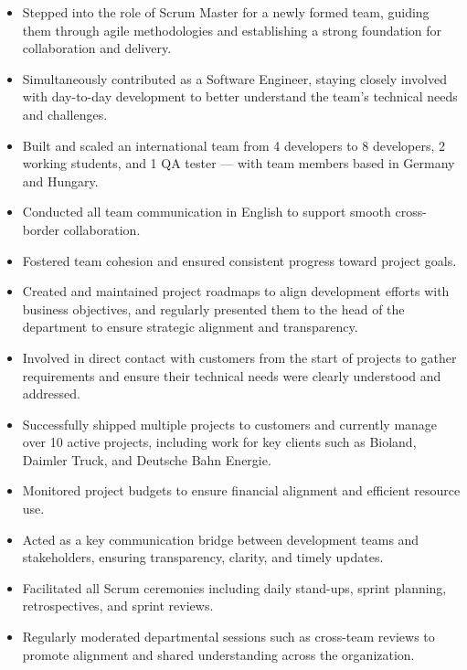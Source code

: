 \documentclass[10pt, a4paper]{cvhari}
\begin{document}
    \begin{itemize}
        \item Stepped into the role of Scrum Master for a newly formed team, guiding them through agile methodologies and establishing a strong foundation for collaboration and delivery.

        \item Simultaneously contributed as a Software Engineer, staying closely involved with day-to-day development to better understand the team’s technical needs and challenges.

        \item Built and scaled an international team from 4 developers to 8 developers, 2 working students, and 1 QA tester — with team members based in Germany and Hungary.

        \item Conducted all team communication in English to support smooth cross-border collaboration.

        \item Fostered team cohesion and ensured consistent progress toward project goals.

        \item Created and maintained project roadmaps to align development efforts with business objectives, and regularly presented them to the head of the department to ensure strategic alignment and transparency.

        \item Involved in direct contact with customers from the start of projects to gather requirements and ensure their technical needs were clearly understood and addressed.

        \item Successfully shipped multiple projects to customers and currently manage over 10 active projects, including work for key clients such as Bioland, Daimler Truck, and Deutsche Bahn Energie.

        \item Monitored project budgets to ensure financial alignment and efficient resource use.

        \item Acted as a key communication bridge between development teams and stakeholders, ensuring transparency, clarity, and timely updates.

        \item Facilitated all Scrum ceremonies including daily stand-ups, sprint planning, retrospectives, and sprint reviews.

        \item Regularly moderated departmental sessions such as cross-team reviews to promote alignment and shared understanding across the organization.
        

    \end{itemize}
\end{document}
